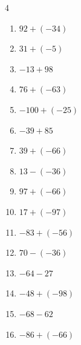\begin{multicols}{4}
\begin{enumerate}
  \item $92+(-34)$

        \phantom{$=58$}

  \item $31+(-5)$

        \phantom{$=26$}

  \item $-13+98$

        \phantom{$=85$}

  \item $76+(-63)$

        \phantom{$=13$}

  \item $-100+(-25)$

        \phantom{$=-125$}

  \item $-39+85$

        \phantom{$=46$}

  \item $39+(-66)$

        \phantom{$=-27$}

  \item $13-(-36)$

        \phantom{$=49$}

  \item $97+(-66)$

        \phantom{$=31$}

  \item $17+(-97)$

        \phantom{$=-80$}

  \item $-83+(-56)$

        \phantom{$=-139$}

  \item $70-(-36)$

        \phantom{$=106$}

  \item $-64-27$

        \phantom{$=-91$}

  \item $-48+(-98)$

        \phantom{$=-146$}

  \item $-68-62$

        \phantom{$=-130$}

  \item $-86+(-66)$

        \phantom{$=-152$}


\end{enumerate}
\end{multicols}
